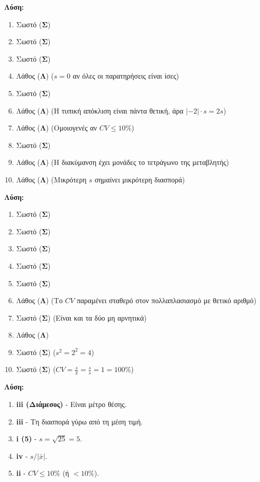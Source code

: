 \documentclass[11pt,a4paper,modern]{FFExercises}
\begin{document}

\askhsh
\textbf{Λύση:}
\begin{enumerate}
    \item Σωστό (\textbf{Σ})
    \item Σωστό (\textbf{Σ})
    \item Σωστό (\textbf{Σ})
    \item Λάθος (\textbf{Λ}) ($s=0$ αν όλες οι παρατηρήσεις είναι ίσες)
    \item Σωστό (\textbf{Σ})
    \item Λάθος (\textbf{Λ}) (Η τυπική απόκλιση είναι πάντα θετική, άρα $|-2| \cdot s = 2s$)
    \item Λάθος (\textbf{Λ}) (Ομοιογενές αν $CV \le 10\%$)
    \item Σωστό (\textbf{Σ})
    \item Λάθος (\textbf{Λ}) (Η διακύμανση έχει μονάδες το τετράγωνο της μεταβλητής)
    \item Λάθος (\textbf{Λ}) (Μικρότερη $s$ σημαίνει μικρότερη διασπορά)
\end{enumerate}

\askhsh
\textbf{Λύση:}
\begin{enumerate}
    \item Σωστό (\textbf{Σ})
    \item Σωστό (\textbf{Σ})
    \item Σωστό (\textbf{Σ})
    \item Σωστό (\textbf{Σ})
    \item Σωστό (\textbf{Σ})
    \item Λάθος (\textbf{Λ}) (Το $CV$ παραμένει σταθερό στον πολλαπλασιασμό με θετικό αριθμό)
    \item Σωστό (\textbf{Σ}) (Είναι και τα δύο μη αρνητικά)
    \item Λάθος (\textbf{Λ})
    \item Σωστό (\textbf{Σ}) ($s^2 = 2^2 = 4$)
    \item Σωστό (\textbf{Σ}) ($CV = \frac{s}{\bar{x}} = \frac{s}{s} = 1 = 100\%$)
\end{enumerate}

\askhsh
\textbf{Λύση:}
\begin{enumerate}
    \item \textbf{iii (Διάμεσος)} - Είναι μέτρο θέσης.
    \item \textbf{iii} - Τη διασπορά γύρω από τη μέση τιμή.
    \item \textbf{i (5)} - $s = \sqrt{25} = 5$.
    \item \textbf{iv} - $s/|\bar{x}|$.
    \item \textbf{ii} - $CV \le 10\%$ (ή $<10\%$).
\end{enumerate}
\end{document}
